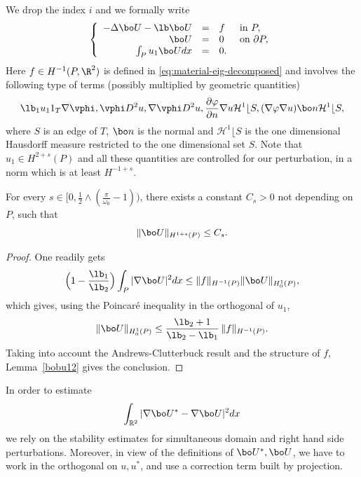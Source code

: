 We drop the index $i$ and we formally write
\begin{equation}\label{bobu28}
\left\{ \begin{array}{rcll}
-\Delta \bo U - \lb \bo U& =& f& \text{ in }P,\\
\bo U&= &0 & \text{ on }\partial P,\\
\int_P u_1 \bo U dx&= &0.
\end{array} \right.
\end{equation}
Here $f \in H^{-1} (P, \R^2)$ is defined in \eqref{eq:material-eig-decomposed} and involves the following type of terms (possibly multiplied by geometric quantities)
\[
\lb_1 u_11_T \nabla \vphi, \vphi D^2 u, \nabla \vphi D^2 u, \frac{ \partial \varphi }{\partial n} \nabla u {\mathcal H^1}\lfloor S, (\nabla \varphi \nabla u) \bo n {\mathcal H^1}\lfloor S,
\]
where $S$ is an edge of $T$, $\bo n$ is the normal and ${\mathcal H^1}\lfloor S$ is the one dimensional Hausdorff measure restricted to the one dimensional set $S$. Note that $u_1 \in H^{2+s} (P)$ and all these quantities are controlled for our perturbation, in a norm which is at least $H^{-1+s}$.
\begin{lemma} \label{bobu27}
For every $s \in \bigl[0, \frac 12\wedge (\frac{\pi}{\omega_0}-1)\bigr)$, there exists a constant $C_s>0$ not depending on $P$, such that
\[
\|\bo U\|_{H^{1+s} (P)} \le C_s.
\]
\end{lemma}
\begin{proof}
One readily gets
\[
\Bigl(1 -\frac{\lb_1}{\lb_2} \Bigr) \int _P |\nabla \bo U |^2 dx \le \|f\|_{H^{-1}(P)} \| \bo U \|_{H^1_0(P)},
\]
which gives, using the Poincaré inequality in the orthogonal of $u_1$,
\[
\| \bo U \|_{H^1_0(P)} \le \frac{\lb_2+1}{\lb_2-\lb_1}\,\|f\|_{H^{-1}(P)}.
\]
Taking into account the Andrews-Clutterbuck result \cite{AnCl11} and the structure of $f$, Lemma~\ref{bobu12} gives the conclusion.
\end{proof}

In order to estimate
\[
\int_{ {\Bbb{R}^2}} |\nabla \bo U^* - \nabla\bo U |^2 dx
\]
we rely on the stability estimates for simultaneous domain and right hand side perturbations. Moreover, in view of the definitions of $\bo U^*, \bo U$, we have to work in the orthogonal on $u, u^*$, and use a correction term built by projection.

